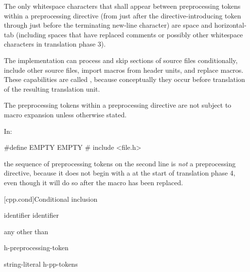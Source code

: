 \pnum
The only whitespace characters that shall appear
between preprocessing tokens
within a preprocessing directive
(from just after the directive-introducing token
through just before the terminating new-line character)
are space and horizontal-tab
(including spaces that have replaced comments
or possibly other whitespace characters
in translation phase 3).

\pnum
The implementation can
process and skip sections of source files conditionally,
include other source files,
import macros from header units,
and replace macros.
These capabilities are called
,
because conceptually they occur
before translation of the resulting translation unit.

\pnum
The preprocessing tokens within a preprocessing directive
are not subject to macro expansion unless otherwise stated.

\begin{example}
In:
\begin{codeblock}
#define EMPTY
EMPTY   #   include <file.h>
\end{codeblock}
the sequence of preprocessing tokens on the second line is \textit{not}
a preprocessing directive, because it does not begin with a \tcode{\#} at the start of
translation phase 4, even though it will do so after the macro 
has been replaced.
\end{example}

[cpp.cond]{Conditional inclusion}%
%

%
\begin{bnf}
\br
     identifier\br
     identifier \terminal{)}
\end{bnf}

\begin{bnf}
\br
    \textnormal{any  other than \terminal{>}}
\end{bnf}

\begin{bnf}
\br
    h-preprocessing-token 
\end{bnf}

\begin{bnf}
\br
    string-literal\br
    \terminal{<} h-pp-tokens \terminal{>}
\end{bnf}

